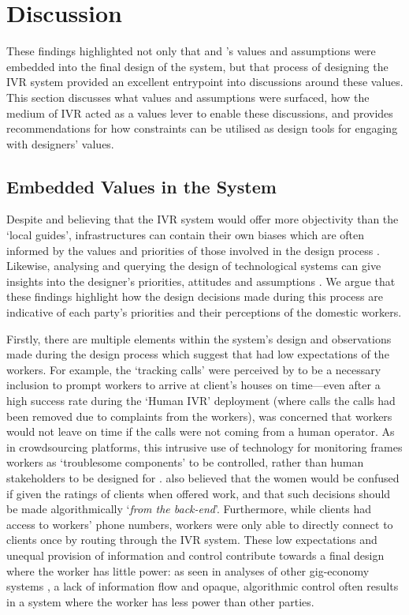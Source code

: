 \section{Discussion}

These findings highlighted not only that \NGO{} and \PC{}'s values and assumptions were embedded into the final design of the system, but that process of designing the IVR system provided an excellent entrypoint into discussions around these values. This section discusses what values and assumptions were surfaced, how the medium of IVR acted as a values lever to enable these discussions, and provides recommendations for how constraints can be utilised as design tools for engaging with designers' values.

\subsection{Embedded Values in the System}

Despite \PC{} and \NGO{} believing that the IVR system would offer more objectivity than the `local guides', infrastructures can contain their own biases which are often informed by the values and priorities of those involved in the design process \citep{winner1980}. Likewise, analysing and querying the design of technological systems can give insights into the designer's priorities, attitudes and assumptions \citep{Star1999}. We argue that these findings highlight how the design decisions made during this process are indicative of each party's priorities and their perceptions of the domestic workers.

Firstly, there are multiple elements within the system's design and observations made during the design process which suggest that \PC{} had low expectations of the workers. For example, the `tracking calls' were perceived by \PC{} to be a necessary inclusion to prompt workers to arrive at client's houses on time---even after a high success rate during the `Human IVR' deployment (where calls the calls had been removed due to complaints from the workers), \PC{} was concerned that workers would not leave on time if the calls were not coming from a human operator. As in crowdsourcing platforms, this intrusive use of technology for monitoring frames workers as `troublesome components' to be controlled, rather than human stakeholders to be designed for \cite{martin2016, Irani2013}. \PC{} also believed that the women would be confused if given the ratings of clients when offered work, and that such decisions should be made algorithmically `\textit{from the back-end}'. Furthermore, while clients had access to workers' phone numbers, workers were only able to directly connect to clients once by routing through the IVR system. These low expectations and unequal provision of information and control contribute towards a final design where the worker has little power: as seen in analyses of other gig-economy systems \cite{martin2016, Hara2018, carlos2021, lee2015}, a lack of information flow and opaque, algorithmic control often results in a system where the worker has less power than other parties. 

